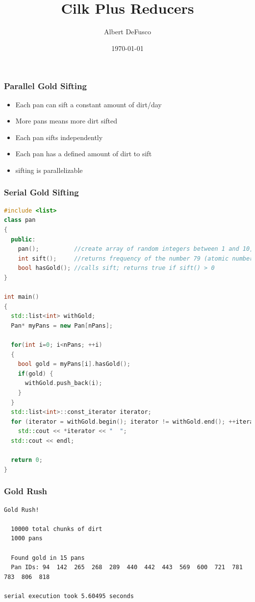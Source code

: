 \documentclass[fleqn,xcolor=table,10pt,final]{beamer}
\begin{document}
\title{Cilk Plus Reducers}
\author{Albert DeFusco}
\date{\today}
\frame{\titlepage}


\begin{frame}
  \frametitle{Parallel Gold Sifting}
  \begin{itemize}
    \item Each pan can sift a constant amount of dirt/day
    \item More pans means more dirt sifted
  \end{itemize}
  \vskip 0.2cm
  \begin{itemize}
    \item<2-> Each pan sifts independently
    \item<2-> Each pan has a defined amount of dirt to sift
  \end{itemize}
  \vskip 0.2cm
  \begin{itemize}
    \item<3-> sifting is parallelizable
  \end{itemize}
\end{frame}

\begin{frame}[fragile]
  \frametitle{Serial Gold Sifting}
  \begin{lstlisting}[language=C++,basicstyle=\scriptsize]
#include <list>
class pan
{
  public:
    pan();          //create array of random integers between 1 and 10,000
    int sift();     //returns frequency of the number 79 (atomic number of gold)
    bool hasGold(); //calls sift; returns true if sift() > 0
}

int main()
{
  std::list<int> withGold;
  Pan* myPans = new Pan[nPans];

  for(int i=0; i<nPans; ++i)
  {
    bool gold = myPans[i].hasGold();
    if(gold) {
      withGold.push_back(i);
    }
  }
  std::list<int>::const_iterator iterator;
  for (iterator = withGold.begin(); iterator != withGold.end(); ++iterator)
    std::cout << *iterator << "  ";
  std::cout << endl;

  return 0;
}
  \end{lstlisting}
\end{frame}

\begin{frame}[fragile]
  \frametitle{Gold Rush}
  {\scriptsize
  \begin{verbatim}
Gold Rush!

  10000 total chunks of dirt
  1000 pans

  Found gold in 15 pans
  Pan IDs: 94  142  265  268  289  440  442  443  569  600  721  781  783  806  818

serial execution took 5.60495 seconds
  \end{verbatim}
}
\end{frame}
\end{document}
